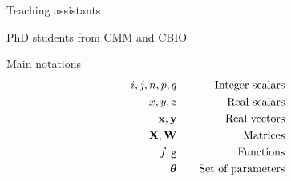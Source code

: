 \documentclass[xcolor=pdftex,dvipsnames,table,mathserif]{beamer}
\begin{document}
\begin{frame}{Teaching assistants}


  \begin{block}{}
    PhD students from CMM and CBIO
  \end{block}

\end{frame}





\begin{frame}{Main notations}
  \begin{eqnarray*}
    i, j, n, p, q & \hspace{1em} & \text{Integer scalars} \\
    x, y, z & \hspace{1em} & \text{Real scalars} \\
    \mathbf{x}, \mathbf{y} & \hspace{1em} & \text{Real vectors} \\
    \mathbf{X}, \mathbf{W} & \hspace{1em} & \text{Matrices} \\
    f, \texttt{g} & \hspace{1em} & \text{Functions} \\
    \boldsymbol{\theta} & \hspace{1em} & \text{Set of parameters} \\
    \end{eqnarray*}
\end{frame}
\end{document}
